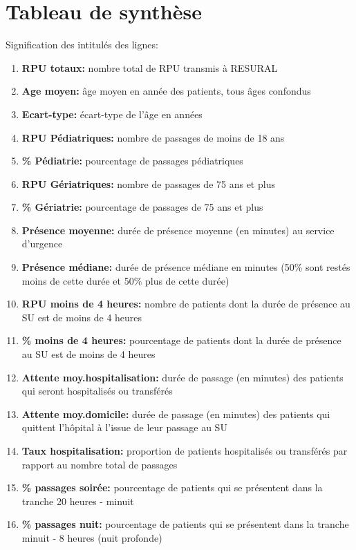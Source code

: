 \documentclass[12pt,english,french,twoside]{book}\usepackage[]{graphicx}\usepackage[]{color}
\begin{document}
\chapter{Tableau de synthèse}





Signification des intitulés des lignes:
\begin{enumerate}
  \item \textbf{RPU totaux:} nombre total de RPU transmis à RESURAL
  \item \textbf{Age moyen:} âge moyen en année des patients, tous âges confondus
  \item \textbf{Ecart-type:} écart-type de l'âge en années
  \item \textbf{RPU Pédiatriques:} nombre de passages de moins de 18 ans
  \item \textbf{\% Pédiatrie:} pourcentage de passages pédiatriques
  \item \textbf{RPU Gériatriques:} nombre de passages de 75 ans et plus
  \item \textbf{\% Gériatrie:} pourcentage de passages de 75 ans et plus
  \item \textbf{Présence moyenne:} durée de présence moyenne (en minutes) au service d'urgence
  \item \textbf{Présence médiane:} durée de présence médiane en minutes (50\% sont restés moins de cette durée et 50\% plus de cette durée)
  \item \textbf{RPU moins de 4 heures:} nombre de patients dont la durée de présence au SU est de moins de 4 heures
  \item \textbf{\% moins de 4 heures:} pourcentage de patients dont la durée de présence au SU est de moins de 4 heures
  \item \textbf{Attente moy.hospitalisation:} durée de passage (en minutes) des patients qui seront hospitalisés ou transférés
  \item \textbf{Attente moy.domicile:} durée de passage (en minutes) des patients qui quittent l'hôpital à l'issue de leur passage au SU
  \item \textbf{Taux hospitalisation:} proportion de patients hospitalisés ou transférés par rapport au nombre total de passages
  \item \textbf{\% passages soirée:} pourcentage de patients qui se présentent dans la tranche 20 heures - minuit
  \item \textbf{\% passages nuit:} pourcentage de patients qui se présentent dans la tranche minuit - 8 heures (nuit profonde)

\end{enumerate}
\end{document}
